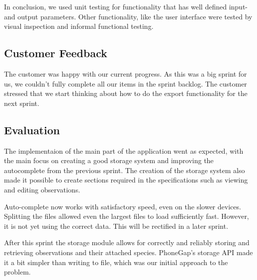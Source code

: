 In conclusion, we used unit testing for functionality that has well defined
input- and output parameters. Other functionality, like the user interface were
tested by visual inspection and informal functional testing.

\subsection{Customer Feedback}
The customer was happy with our current progress. As this was a big sprint for
us, we couldn't fully complete all our items in the sprint backlog. The customer
stressed that we start thinking about how to do the export functionality for the
next sprint.

\subsection{Evaluation}
The implementaion of the main part of the application went as expected, with the
main focus on creating a good storage system and improving the autocomplete from
the previous sprint. The creation of the storage system also made it possible to
create sections required in the specifications such as viewing and editing
observations.

Auto-complete now works with satisfactory speed, even on the slower devices. Splitting the files allowed even the largest files to load sufficiently fast. However, it is not yet using the correct data. This will be rectified in a later sprint.

After this sprint the storage module allows for correctly and reliably storing and retrieving observations and their attached species. PhoneGap's storage API made it a bit simpler than writing to file, which was our initial approach to the problem.
